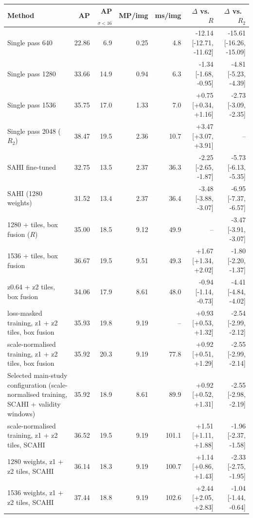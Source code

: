 \begin{tabular}{lrrrrrr}
\toprule
Method & AP & AP$_{\sigma<16}$ & MP/img & ms/img & $\Delta$ vs.\ $R$ & $\Delta$ vs.\ $R_2$ \\
\midrule
Single pass 640 & 22.86 & 6.9 & 0.25 & 4.8 & -12.14 {\scriptsize[-12.71, -11.62]} & -15.61 {\scriptsize[-16.26, -15.09]} \\
Single pass 1280 & 33.66 & 14.9 & 0.94 & 6.3 & -1.34 {\scriptsize[-1.68, -0.95]} & -4.81 {\scriptsize[-5.23, -4.39]} \\
Single pass 1536 & 35.75 & 17.0 & 1.33 & 7.0 & +0.75 {\scriptsize[+0.34, +1.16]} & -2.73 {\scriptsize[-3.09, -2.35]} \\
Single pass 2048 ($R_2$) & 38.47 & 19.5 & 2.36 & 10.7 & +3.47 {\scriptsize[+3.07, +3.91]} & -- \\
SAHI fine-tuned & 32.75 & 13.5 & 2.37 & 36.3 & -2.25 {\scriptsize[-2.65, -1.87]} & -5.73 {\scriptsize[-6.13, -5.35]} \\
SAHI (1280 weights) & 31.52 & 13.4 & 2.37 & 36.4 & -3.48 {\scriptsize[-3.88, -3.07]} & -6.95 {\scriptsize[-7.37, -6.57]} \\
1280 + tiles, box fusion ($R$) & 35.00 & 18.5 & 9.12 & 49.9 & -- & -3.47 {\scriptsize[-3.91, -3.07]} \\
1536 + tiles, box fusion & 36.67 & 19.5 & 9.51 & 49.3 & +1.67 {\scriptsize[+1.34, +2.02]} & -1.80 {\scriptsize[-2.20, -1.37]} \\
z0.64 + z2 tiles, box fusion & 34.06 & 17.9 & 8.61 & 48.0 & -0.94 {\scriptsize[-1.14, -0.73]} & -4.41 {\scriptsize[-4.84, -4.02]} \\
\midrule
loss-masked training, z1 + z2 tiles, box fusion & 35.93 & 19.8 & 9.19 & -- & +0.93 {\scriptsize[+0.53, +1.32]} & -2.54 {\scriptsize[-2.99, -2.12]} \\
scale-normalised training, z1 + z2 tiles, box fusion & 35.92 & 20.3 & 9.19 & 77.8 & +0.92 {\scriptsize[+0.51, +1.29]} & -2.55 {\scriptsize[-2.99, -2.14]} \\
Selected main-study configuration (scale-normalised training, SCAHI + validity windows) & 35.92 & 18.9 & 8.61 & 89.9 & +0.92 {\scriptsize[+0.52, +1.31]} & -2.55 {\scriptsize[-2.98, -2.19]} \\
scale-normalised training, z1 + z2 tiles, SCAHI & 36.52 & 19.5 & 9.19 & 101.1 & +1.51 {\scriptsize[+1.11, +1.88]} & -1.96 {\scriptsize[-2.37, -1.58]} \\
1280 weights, z1 + z2 tiles, SCAHI & 36.14 & 18.3 & 9.19 & 100.7 & +1.14 {\scriptsize[+0.86, +1.43]} & -2.33 {\scriptsize[-2.75, -1.95]} \\
1536 weights, z1 + z2 tiles, SCAHI & 37.44 & 18.8 & 9.19 & 102.6 & +2.44 {\scriptsize[+2.05, +2.83]} & -1.04 {\scriptsize[-1.44, -0.64]} \\
\bottomrule
\end{tabular}
